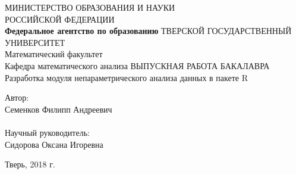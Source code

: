 \documentclass[14pt,a4paper]{scrartcl}
\begin{document}
    \begin{titlepage}
        \begin{center}
            \large
            МИНИСТЕРСТВО ОБРАЗОВАНИЯ И НАУКИ\\ РОССИЙСКОЙ ФЕДЕРАЦИИ\\
            \textbf{Федеральное агентство по образованию}
            \vspace{0.5cm}
            ТВЕРСКОЙ ГОСУДАРСТВЕННЫЙ УНИВЕРСИТЕТ\\
            \vspace{0.25cm}
            Математический факультет\\
            Кафедра математического анализа
            \vfill
            \textsc{ВЫПУСКНАЯ РАБОТА БАКАЛАВРА}\\[5mm]
            {\LARGE Разработка модуля непараметрического анализа данных в пакете R\\[2mm]}
            \bigskip
        \end{center}
        \vfill
        \hfill
        \begin{minipage}{0.4\textwidth}
            Автор:\\
            Семенков Филипп Андреевич\\ \\
            Научный руководитель:\\
            Сидорова Оксана Игоревна\\
        \end{minipage}
        \vfill
        \begin{center}
            Тверь, 2018 г.
        \end{center}
    \end{titlepage}

    \newpage
    \tableofcontents

    \newpage
\end{document}
